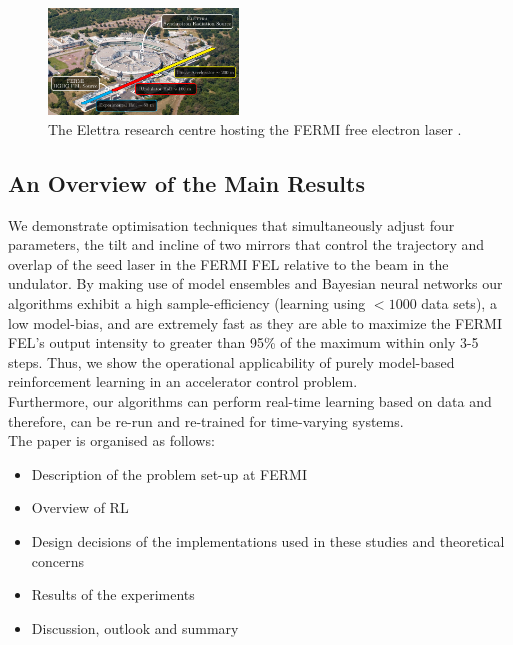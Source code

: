 \documentclass[
reprint,nofootinbib,
amsmath,amssymb,amsfonts,clevref,
aps,
prstab,
]{revtex4-2}
\begin{document}
	\begin{figure}[h]
		\centering
		\includegraphics*[width=0.45\textwidth]{Figures/FERMI_AerialView}
		\caption{The Elettra research centre hosting the FERMI free electron laser \cite{Brochon2020}.}
		\label{fig:elletra_research}
	\end{figure}
	\subsection{An Overview of the Main Results}
	We demonstrate optimisation techniques that simultaneously adjust four parameters, the tilt and incline of two mirrors that control the trajectory and overlap of the seed laser in the FERMI FEL relative to the beam in the undulator. 
	By making use of model ensembles and Bayesian neural networks our algorithms exhibit a high sample-efficiency (learning using $<1000$ data sets), a low model-bias, and are extremely fast as they are able to maximize the FERMI FEL's output intensity to greater than 95\% of the maximum within only 3-5 steps.
	 Thus, we show the operational applicability of purely model-based reinforcement learning in an accelerator control problem.\\
	Furthermore, our algorithms can perform real-time learning based on data and therefore, can be re-run and re-trained for time-varying systems.\\
	The paper is organised as follows:
	\begin{itemize}
		\item Description of the problem set-up at FERMI
		\item Overview of RL
		\item Design decisions of the implementations used in these studies and theoretical concerns
		\item Results of the experiments 
		\item Discussion, outlook and summary
	\end{itemize}
	
\end{document}
